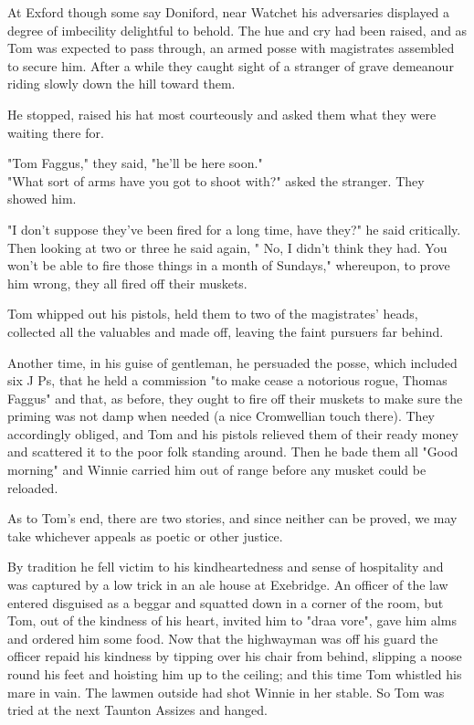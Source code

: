 At Exford   though some say Doniford, near Watchet   his adversaries displayed a degree of imbecility delightful to behold. The hue and cry had been raised, and as Tom was expected to pass through, an armed posse with magistrates assembled to secure him. After a while they caught sight of a stranger of grave demeanour riding slowly down the hill toward them. 

He stopped, raised his hat most courteously and asked them what they were waiting there for. 

 "Tom Faggus," they said, "he'll be here soon." \\
 "What sort of arms have you got to shoot with?" asked the stranger. They showed him. 

"I don't suppose they've been fired for a long time, have they?" he said critically. Then looking at two or three he said again, " No, I didn’t think they had. You won't be able to fire those things in a month of Sundays," whereupon, to prove him wrong, they all fired off their muskets. 

Tom whipped out his pistols, held them to two of the magistrates' heads, collected all the valuables and made off, leaving the faint pursuers far behind.

Another time, in his guise of gentleman, he persuaded the posse, which included six J Ps, that he held a commission "to make cease a notorious rogue, Thomas Faggus" and that, as before, they ought to fire off their muskets to make sure the priming was not damp when needed (a nice Cromwellian touch there). They accordingly obliged, and Tom and his pistols relieved them of their ready money and scattered it to the poor folk standing around. Then he bade them all "Good morning" and Winnie carried him out of range before any musket could be reloaded.

\Flourish 

As to Tom's end, there are two stories, and since neither can be proved, we may take whichever appeals as poetic or other justice.

By tradition he fell victim to his kindheartedness and sense of hospitality and was captured by a low trick in an ale house at Exebridge. An officer of the law entered disguised as a beggar and squatted down in a corner of the room, but Tom, out of the kindness of his heart, invited him to "draa vore", gave him alms and ordered him some food. Now that the highwayman was off his guard the officer repaid his kindness by tipping over his chair from behind, slipping a noose round his feet and hoisting him up to the ceiling; and this time Tom whistled his mare in vain. The lawmen outside had shot Winnie in her stable. So Tom was tried at the next Taunton Assizes and hanged.

